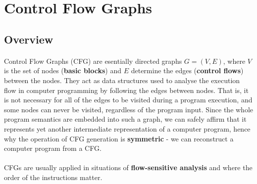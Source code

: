 \section{Control Flow Graphs}
\subsection{Overview}
\paragraph*{}
Control Flow Graphs (CFG) are esentially directed graphs $G=(V, E)$, where $V$ is the set of nodes (\textbf{basic blocks}) and $E$ determine the edges (\textbf{control flows}) between the nodes. They act as data structures used to analyse the execution flow in computer programming by following the edges between nodes. That is, it is not necessary for all of the edges to be visited during a program execution, and some nodes can never be visited, regardless of the program input. Since the whole program semantics are embedded into such a graph, we can safely affirm that it represents yet another intermediate representation of a computer program, hence why the operation of CFG generation is \textbf{symmetric} - we can reconstruct a computer program from a CFG.

\paragraph*{}
CFGs are usually applied in situations of \textbf{flow-sensitive analysis} and where the order of the instructions matter. 


